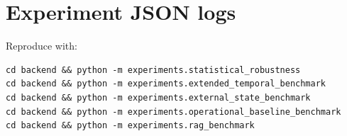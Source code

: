 \documentclass[11pt,a4paper]{article}
\begin{document}
\section{Experiment JSON logs}
Reproduce with:
\begin{verbatim}
cd backend && python -m experiments.statistical_robustness
cd backend && python -m experiments.extended_temporal_benchmark
cd backend && python -m experiments.external_state_benchmark
cd backend && python -m experiments.operational_baseline_benchmark
cd backend && python -m experiments.rag_benchmark
\end{verbatim}
\end{document}
